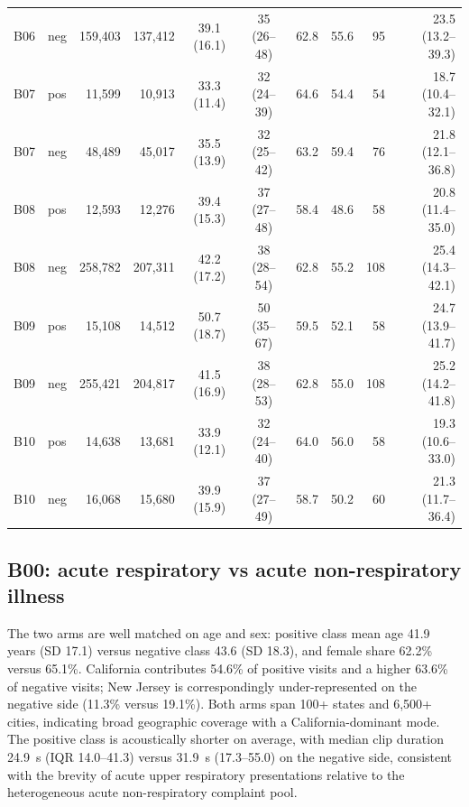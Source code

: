 \documentclass[utf8]{frontiers_suppmat} %
\begin{document}
\begin{table}[t]
\begin{tabular}{l l r r c c r r r r}
B06 & neg & 159{,}403 & 137{,}412 & 39.1 (16.1) & 35 (26--48) & 62.8 & 55.6 &  95 & 23.5 (13.2--39.3) \\
B07 & pos &  11{,}599 &  10{,}913 & 33.3 (11.4) & 32 (24--39) & 64.6 & 54.4 &  54 & 18.7 (10.4--32.1) \\
B07 & neg &  48{,}489 &  45{,}017 & 35.5 (13.9) & 32 (25--42) & 63.2 & 59.4 &  76 & 21.8 (12.1--36.8) \\
B08 & pos &  12{,}593 &  12{,}276 & 39.4 (15.3) & 37 (27--48) & 58.4 & 48.6 &  58 & 20.8 (11.4--35.0) \\
B08 & neg & 258{,}782 & 207{,}311 & 42.2 (17.2) & 38 (28--54) & 62.8 & 55.2 & 108 & 25.4 (14.3--42.1) \\
B09 & pos &  15{,}108 &  14{,}512 & 50.7 (18.7) & 50 (35--67) & 59.5 & 52.1 &  58 & 24.7 (13.9--41.7) \\
B09 & neg & 255{,}421 & 204{,}817 & 41.5 (16.9) & 38 (28--53) & 62.8 & 55.0 & 108 & 25.2 (14.2--41.8) \\
B10 & pos &  14{,}638 &  13{,}681 & 33.9 (12.1) & 32 (24--40) & 64.0 & 56.0 &  58 & 19.3 (10.6--33.0) \\
B10 & neg &  16{,}068 &  15{,}680 & 39.9 (15.9) & 37 (27--49) & 58.7 & 50.2 &  60 & 21.3 (11.7--36.4) \\
\bottomrule
\end{tabular}
\end{table}

\subsection{B00: acute respiratory vs acute non-respiratory illness}

The two arms are well matched on age and sex: positive class
mean age 41.9 years (SD 17.1) versus negative class 43.6 (SD 18.3),
and female share 62.2\% versus 65.1\%. California contributes 54.6\%
of positive visits and a higher 63.6\% of negative visits; New Jersey
is correspondingly under-represented on the negative side (11.3\%
versus 19.1\%). Both arms span 100+ states and 6{,}500+ cities,
indicating broad geographic coverage with a California-dominant
mode. The positive class is acoustically shorter on average, with median
clip duration 24.9~s (IQR 14.0--41.3) versus 31.9~s (17.3--55.0) on
the negative side, consistent with the brevity of acute upper
respiratory presentations relative to the heterogeneous acute
non-respiratory complaint pool.
\end{document}
